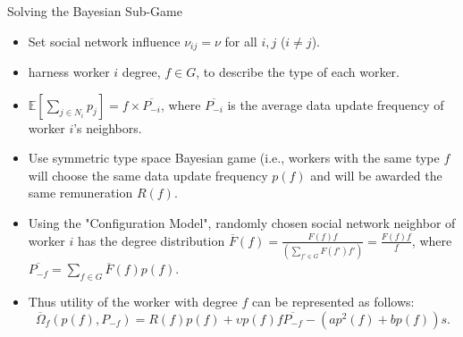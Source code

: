 \documentclass[aspectratio=169,xcolor=dvipsnames]{beamer}
\begin{document}
\begin{frame}[fragile]{Solving the Bayesian Sub-Game}
     \footnotesize %
    \begin{itemize}[<+-| alert@+>]
        \item Set social network influence \(\nu_{ij} = \nu\) for all \(i, j\) (\(i \neq j\)). 
        \item harness worker \(i\) degree, \(f \in G\), to describe the type of each worker. 
        \item \(\mathbb{E}[\sum_{j \in N_i} p_j] = f \times \overline{P_{-i}}\), where \(\overline{P_{-i}}\) is the average data update frequency of worker \(i\)'s neighbors.
        \item Use symmetric type space Bayesian game (i.e., workers with the same type \(f\) will choose the same data update frequency \(p(f)\) and will be awarded the same remuneration \(R(f)\).
        \item Using the "Configuration Model", randomly chosen social network neighbor of worker \(i\) has the degree distribution \(\overline{F}(f) = \frac{F(f)f}{\left(\sum_{f' \in G} F(f')f'\right)} = \frac{F(f)f}{\underline{f}}\), where \(\overline{P_{-f}} = \sum_{f \in G} \overline{F}(f)p(f).\)
        \item Thus utility of the worker with degree \(f\) can be represented as follows:
        \[
        \overline{\Omega}_f(p(f), P_{-f}) = R(f)p(f) + \upsilon p(f)f\overline{P_{-f}} - \left(a p^2(f) + b p(f)\right)s.
        \]
    \end{itemize}
  
\end{frame}

\end{document}
